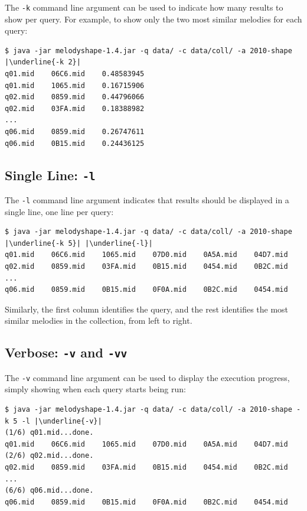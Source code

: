\documentclass[twoside]{article}
\begin{document}
The \texttt{-k} command line argument can be used to indicate how many results to show per query. For example, to show only the two most similar melodies for each query:
\begin{lstlisting}
$ java -jar melodyshape-1.4.jar -q data/ -c data/coll/ -a 2010-shape |\underline{-k 2}|
q01.mid    06C6.mid    0.48583945
q01.mid    1065.mid    0.16715906
q02.mid    0859.mid    0.44796066
q02.mid    03FA.mid    0.18388982
...
q06.mid    0859.mid    0.26747611
q06.mid    0B15.mid    0.24436125
\end{lstlisting}

\subsection{Single Line: \texttt{-l}}

The \texttt{-l} command line argument indicates that results should be displayed in a single line, one line per query:
\begin{lstlisting}
$ java -jar melodyshape-1.4.jar -q data/ -c data/coll/ -a 2010-shape |\underline{-k 5}| |\underline{-l}|
q01.mid    06C6.mid    1065.mid    07D0.mid    0A5A.mid    04D7.mid
q02.mid    0859.mid    03FA.mid    0B15.mid    0454.mid    0B2C.mid
...
q06.mid    0859.mid    0B15.mid    0F0A.mid    0B2C.mid    0454.mid
\end{lstlisting}

Similarly, the first column identifies the query, and the rest identifies the most similar melodies in the collection, from left to right.

\subsection{Verbose: \texttt{-v} and \texttt{-vv}}

The \texttt{-v} command line argument can be used to display the execution progress, simply showing when each query starts being run:
\begin{lstlisting}
$ java -jar melodyshape-1.4.jar -q data/ -c data/coll/ -a 2010-shape -k 5 -l |\underline{-v}|
(1/6) q01.mid...done.
q01.mid    06C6.mid    1065.mid    07D0.mid    0A5A.mid    04D7.mid
(2/6) q02.mid...done.
q02.mid    0859.mid    03FA.mid    0B15.mid    0454.mid    0B2C.mid
...
(6/6) q06.mid...done.
q06.mid    0859.mid    0B15.mid    0F0A.mid    0B2C.mid    0454.mid
\end{lstlisting}
\end{document}
